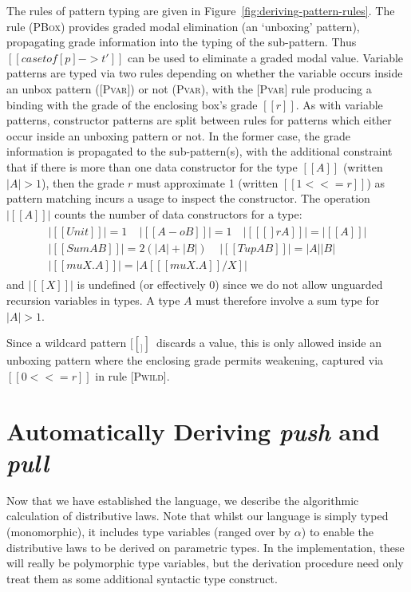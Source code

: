 The rules of pattern typing are given in
Figure~\ref{fig:deriving-pattern-rules}.
The rule (\textsc{PBox}) provides
graded modal elimination (an `unboxing' pattern),
propagating grade information into the typing of the
sub-pattern. Thus $[[ case t of [p] -> t' ]]$ can be used to eliminate
a graded modal value. Variable patterns are typed via two
rules depending on whether the variable occurs inside an unbox pattern
(\textsc{[Pvar]}) or not (\textsc{Pvar}),
with the \textsc{[Pvar]} rule producing a binding with the grade of
the enclosing box’s grade $[[ r ]]$.
As with variable patterns, constructor patterns are split
between rules for patterns which either occur inside an unboxing
pattern or not. In the former case, the grade information is
propagated to the sub-pattern(s), with the additional constraint that
if there is more than one data constructor for the type $[[ A ]]$ (written
$|A| > 1$), then the grade $r$ must approximate 1 (written $[[ 1 <<= r
]]$) as pattern matching
incurs a usage to inspect the constructor. The
operation $|[[ A ]]|$ counts the number of data constructors
for a type:
%
\begin{align*}
  \begin{array}{c}
|[[ Unit ]]| = 1 \;\;\;\;
|[[ A -o B ]]| = 1 \;\;\;\,
|[[ [] r A ]]| = |[[  A ]]| \\
|[[ Sum A B ]]| = 2 (|A| + |B|) \;\;\;\;
|[[ Tup A B ]]| = |A| |B| \\
|[[ mu X . A ]]| = |A [ [[ mu X . A ]] / X ]|
  \end{array}
\end{align*}
%
and $|[[ X ]]|$ is undefined (or effectively 0) since we do not
allow unguarded recursion variables in types.
A type $A$ must therefore involve a sum type for $|A| > 1$.

Since a wildcard pattern $[[ _ ]]\,$ discards a value, this is only
allowed inside an unboxing pattern where the enclosing grade
permits weakening, captured via $[[ 0 <<= r ]]$ in rule \textsc{[Pwild]}.


\section{Automatically Deriving \emph{push} and \emph{pull}}
\label{sec:push-pull-deriv}
Now that we have established the language, we describe the algorithmic
calculation of distributive laws. Note that whilst our language is simply typed
(monomorphic), it includes type variables (ranged over by $\alpha$) to enable
the distributive laws to be derived on parametric types. In the implementation,
these will really be polymorphic type variables, but the derivation procedure
need only treat them as some additional syntactic type construct.

